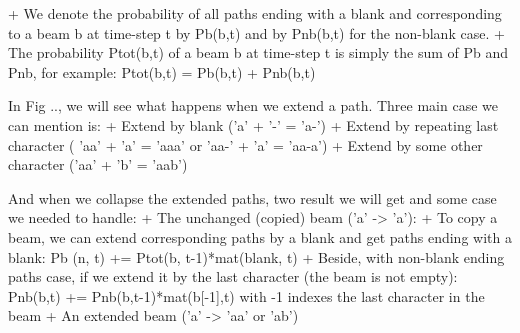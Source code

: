       + We denote the probability of all paths ending with a blank and corresponding to a beam b at time-step t 
      by Pb(b,t) and by Pnb(b,t) for the non-blank case.
      + The probability Ptot(b,t) of a beam b at time-step t is simply the sum of Pb and Pnb, for example:
      Ptot(b,t) = Pb(b,t) + Pnb(b,t)

      In Fig .., we will see what happens when we extend a path. Three main case we can mention
      is: 
        + Extend by blank ('a' + '-' = 'a-')
        + Extend by repeating last character ( 'aa' + 'a' = 'aaa' or 'aa-' + 'a' = 'aa-a')
        + Extend by some other character ('aa' + 'b' = 'aab')
      
      And when we collapse the extended paths, two result we will get and some case we needed to handle:
        + The unchanged (copied) beam ('a' -> 'a'):
          + To copy a beam, we can extend corresponding paths by a blank and get
          paths ending with a blank: Pb (n, t) += Ptot(b, t-1)*mat(blank, t)
          + Beside, with non-blank ending paths case, if we extend it by the last
          character (the beam is not empty): Pnb(b,t) += Pnb(b,t-1)*mat(b[-1],t)
          with -1 indexes the last character in the beam
        + An extended beam ('a' -> 'aa' or 'ab')

